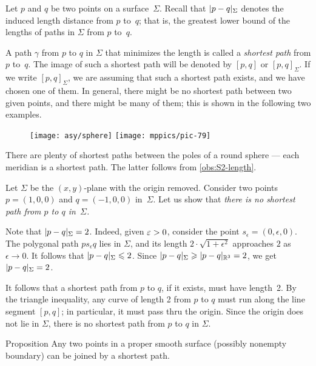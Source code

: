 Let $p$ and $q$ be two points on a surface~$\Sigma$.
Recall that $\dist{p}{q}\Sigma$ denotes the induced length distance from $p$ to~$q$;
that is, the greatest lower bound of the lengths of paths in $\Sigma$ from $p$ to~$q$.


A path $\gamma$ from $p$ to $q$ in $\Sigma$ that minimizes the length is called a \emph{shortest path} from $p$ to~$q$.
The image of such a shortest path will be denoted by $[p,q]$ or $[p,q]_\Sigma$.
If we write $[p,q]_\Sigma$, we are assuming that such a shortest path exists, and we have chosen one of them.
In general, there might be no shortest path between two given points, and there might be many of them;
this is shown in the following two examples.


{

\begin{wrapfigure}[9]{r}{28 mm}
\vskip-6mm
\centering
\texttt{[image: asy/sphere]}
\bigskip
\texttt{[image: mppics/pic-79]}
\end{wrapfigure}

 There are plenty of shortest paths between the poles of a round sphere --- each meridian is a shortest path.
The latter follows from \ref{obs:S2-length}.

 Let $\Sigma$ be the $(x,y)$-plane with the origin removed.
Consider two points $p=(1,0,0)$ and $q=(-1,0,0)$ in~$\Sigma$.
Let us show that \textit{there is no shortest path from $p$ to $q$ in~$\Sigma$.}

Note that $\dist{p}{q}\Sigma=2$. 
Indeed, given $\epsilon\z>0$, consider the point $s_\epsilon=(0,\epsilon,0)$.
The polygonal path $ps_\epsilon q$ lies in $\Sigma$, and its length $2\cdot\sqrt{1+\epsilon^2}$ approaches $2$ as $\epsilon\to0$.
It follows that $\dist{p}{q}\Sigma\le 2$.
Since $\dist{p}{q}\Sigma\z\ge \dist{p}{q}{\mathbb{R}^3}=2$, we get $\dist{p}{q}\Sigma=2$.

It follows that a shortest path from $p$ to $q$, if it exists, must have length~2.
By the triangle inequality, any curve of length 2 from $p$ to $q$ must run along the line segment $[p,q]$;
in particular, it must pass thru the origin.
Since the origin does not lie in $\Sigma$, there is no shortest path from $p$ to $q$ in $\Sigma$. 


\begin{thm}{Proposition}\label{prop:shortest-paths-exist}
Any two points in a proper smooth surface (possibly nonempty boundary) can be joined by a shortest path. 
\end{thm}

}
